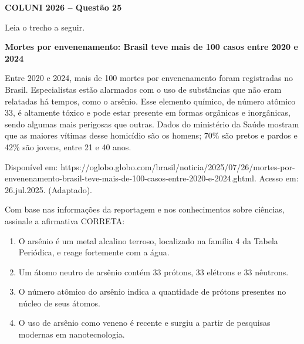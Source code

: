 \textbf{COLUNI 2026 -- Questão 25}\par\medskip Leia o trecho a seguir.

\textbf{Mortes por envenenamento: Brasil teve mais de 100 casos entre 2020 e 2024}

Entre 2020 e 2024, mais de 100 mortes por envenenamento foram registradas no Brasil. Especialistas estão alarmados com o uso de substâncias que não eram relatadas há tempos, como o arsênio. Esse elemento químico, de número atômico 33, é altamente tóxico e pode estar presente em formas orgânicas e inorgânicas, sendo algumas mais perigosas que outras. Dados do ministério da Saúde mostram que as maiores vítimas desse homicídio são os homens; 70\% são pretos e pardos e 42\% são jovens, entre 21 e 40 anos.\par
Disponível em: https://oglobo.globo.com/brasil/noticia/2025/07/26/mortes-por-envenenamento-brasil-teve-mais-de-100-casos-entre-2020-e-2024.ghtml. Acesso em: 26.jul.2025. (Adaptado).

Com base nas informações da reportagem e nos conhecimentos sobre ciências, assinale a afirmativa CORRETA:\begin{enumerate}
\item O arsênio é um metal alcalino terroso, localizado na família 4 da Tabela Periódica, e reage fortemente com a água.
\item Um átomo neutro de arsênio contém 33 prótons, 33 elétrons e 33 nêutrons.
\item O número atômico do arsênio indica a quantidade de prótons presentes no núcleo de seus átomos.
\item O uso de arsênio como veneno é recente e surgiu a partir de pesquisas modernas em nanotecnologia.\end{enumerate}